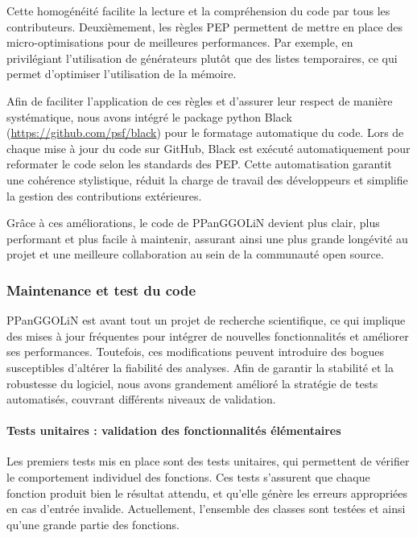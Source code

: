 Cette homogénéité facilite la lecture et la compréhension du code par tous les contributeurs. Deuxièmement, les règles PEP permettent de mettre en place des micro-optimisations pour de meilleures performances. Par exemple, en privilégiant l’utilisation de générateurs plutôt que des listes temporaires, ce qui permet d’optimiser l’utilisation de la mémoire.

Afin de faciliter l’application de ces règles et d’assurer leur respect de manière systématique, nous avons intégré le package python Black (\url{https://github.com/psf/black}) pour le formatage automatique du code. Lors de chaque mise à jour du code sur GitHub, Black est exécuté automatiquement pour reformater le code selon les standards des PEP. Cette automatisation garantit une cohérence stylistique, réduit la charge de travail des développeurs et simplifie la gestion des contributions extérieures.

Grâce à ces améliorations, le code de PPanGGOLiN devient plus clair, plus performant et plus facile à maintenir, assurant ainsi une plus grande longévité au projet et une meilleure collaboration au sein de la communauté open source.

\subsubsection{Maintenance et test du code}

PPanGGOLiN est avant tout un projet de recherche scientifique, ce qui implique des mises à jour fréquentes pour intégrer de nouvelles fonctionnalités et améliorer ses performances. Toutefois, ces modifications peuvent introduire des bogues susceptibles d’altérer la fiabilité des analyses. Afin de garantir la stabilité et la robustesse du logiciel, nous avons grandement amélioré la stratégie de tests automatisés, couvrant différents niveaux de validation.

\paragraph{Tests unitaires : validation des fonctionnalités élémentaires}

Les premiers tests mis en place sont des tests unitaires, qui permettent de vérifier le comportement individuel des fonctions. Ces tests s’assurent que chaque fonction produit bien le résultat attendu, et qu’elle génère les erreurs appropriées en cas d’entrée invalide. Actuellement, l'ensemble des classes sont testées et ainsi qu'une grande partie des fonctions.

